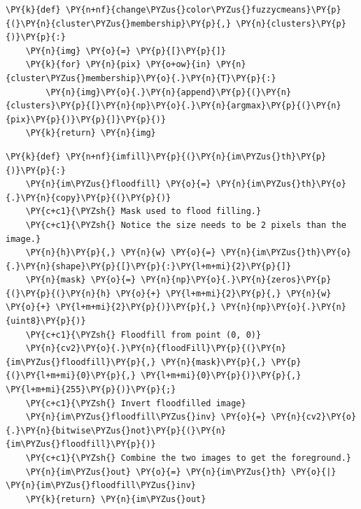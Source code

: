 \begin{tcolorbox}[breakable, size=fbox, boxrule=1pt, pad at break*=1mm,colback=cellbackground, colframe=cellborder]
	\begin{Verbatim}[commandchars=\\\{\}]
\PY{k}{def} \PY{n+nf}{change\PYZus{}color\PYZus{}fuzzycmeans}\PY{p}{(}\PY{n}{cluster\PYZus{}membership}\PY{p}{,} \PY{n}{clusters}\PY{p}{)}\PY{p}{:}
    \PY{n}{img} \PY{o}{=} \PY{p}{[}\PY{p}{]}
    \PY{k}{for} \PY{n}{pix} \PY{o+ow}{in} \PY{n}{cluster\PYZus{}membership}\PY{o}{.}\PY{n}{T}\PY{p}{:}
        \PY{n}{img}\PY{o}{.}\PY{n}{append}\PY{p}{(}\PY{n}{clusters}\PY{p}{[}\PY{n}{np}\PY{o}{.}\PY{n}{argmax}\PY{p}{(}\PY{n}{pix}\PY{p}{)}\PY{p}{]}\PY{p}{)}
    \PY{k}{return} \PY{n}{img}
	\end{Verbatim}
\end{tcolorbox}

\begin{tcolorbox}[breakable, size=fbox, boxrule=1pt, pad at break*=1mm,colback=cellbackground, colframe=cellborder]
	\begin{Verbatim}[commandchars=\\\{\}]
\PY{k}{def} \PY{n+nf}{imfill}\PY{p}{(}\PY{n}{im\PYZus{}th}\PY{p}{)}\PY{p}{:}
    \PY{n}{im\PYZus{}floodfill} \PY{o}{=} \PY{n}{im\PYZus{}th}\PY{o}{.}\PY{n}{copy}\PY{p}{(}\PY{p}{)}
    \PY{c+c1}{\PYZsh{} Mask used to flood filling.}
    \PY{c+c1}{\PYZsh{} Notice the size needs to be 2 pixels than the image.}
    \PY{n}{h}\PY{p}{,} \PY{n}{w} \PY{o}{=} \PY{n}{im\PYZus{}th}\PY{o}{.}\PY{n}{shape}\PY{p}{[}\PY{p}{:}\PY{l+m+mi}{2}\PY{p}{]}
    \PY{n}{mask} \PY{o}{=} \PY{n}{np}\PY{o}{.}\PY{n}{zeros}\PY{p}{(}\PY{p}{(}\PY{n}{h} \PY{o}{+} \PY{l+m+mi}{2}\PY{p}{,} \PY{n}{w} \PY{o}{+} \PY{l+m+mi}{2}\PY{p}{)}\PY{p}{,} \PY{n}{np}\PY{o}{.}\PY{n}{uint8}\PY{p}{)}
    \PY{c+c1}{\PYZsh{} Floodfill from point (0, 0)}
    \PY{n}{cv2}\PY{o}{.}\PY{n}{floodFill}\PY{p}{(}\PY{n}{im\PYZus{}floodfill}\PY{p}{,} \PY{n}{mask}\PY{p}{,} \PY{p}{(}\PY{l+m+mi}{0}\PY{p}{,} \PY{l+m+mi}{0}\PY{p}{)}\PY{p}{,} \PY{l+m+mi}{255}\PY{p}{)}\PY{p}{;}
    \PY{c+c1}{\PYZsh{} Invert floodfilled image}
    \PY{n}{im\PYZus{}floodfill\PYZus{}inv} \PY{o}{=} \PY{n}{cv2}\PY{o}{.}\PY{n}{bitwise\PYZus{}not}\PY{p}{(}\PY{n}{im\PYZus{}floodfill}\PY{p}{)}
    \PY{c+c1}{\PYZsh{} Combine the two images to get the foreground.}
    \PY{n}{im\PYZus{}out} \PY{o}{=} \PY{n}{im\PYZus{}th} \PY{o}{|} \PY{n}{im\PYZus{}floodfill\PYZus{}inv}
    \PY{k}{return} \PY{n}{im\PYZus{}out}
	\end{Verbatim}
\end{tcolorbox}

